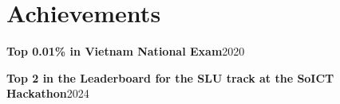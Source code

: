 \section{Achievements}
\resumeSubHeadingListStart

    \resumeProjectHeading
    {\textbf{Top 0.01\% in Vietnam National Exam}}{2020}


    \resumeProjectHeading
    {\textbf{Top 2 in the Leaderboard for the SLU track at the SoICT Hackathon}}{2024}


\resumeSubHeadingListEnd
